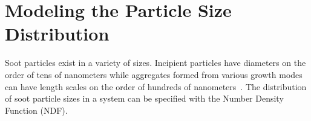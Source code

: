 \section{Modeling the Particle Size Distribution}
\label{sec:subfilter:ndf}

Soot particles exist in a variety of sizes. Incipient particles have diameters on the order of tens of nanometers while aggregates formed from various growth modes can have length scales on the order of hundreds of nanometers~\cite{vanderwal1999}. The distribution of soot particle sizes in a system can be specified with the Number Density Function (NDF).
